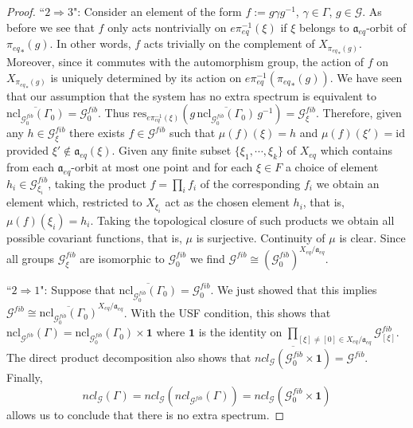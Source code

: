 \documentclass[12pt]{amsart}
\theoremstyle{definition}
\numberwithin{equation}{section}
\newcommand{\tcr}{\textcolor{red}}
\newcommand{\Gg}{{\mathcal G}}
\newcommand{\id}{{\mathbf 1}}
\newcommand{\Xe}{X_{eq}}
\newcommand{\aut}{{\mathfrak a}}
\newcommand{\aute}{\aut_{eq}}
\newcommand{\Xmax}{\Xe}
\newcommand{\pe}{\pi_{eq}}
\newcommand{\res}{\mathrm{res}}
\begin{document}
\begin{proof}
``$2 \Rightarrow 3$":      
Consider an element  of the form $f:=g\gamma g^{-1}$, $\gamma\in\Gamma$, $g\in \Gg$. As before we see that $f$ only acts nontrivially on $e\pe^{-1}(\xi)$ if $\xi$ belongs to  $\aute$-orbit of ${\pe}_*(g)$. In other words, $f$ acts trivially on the complement of $X_{{\pe}_*(g)}$. Moreover, since it commutes with the automorphism group, the action of $f$ on $X_{{\pe}_*(g)}$ is uniquely determined by its action on $e\pe^{-1}({\pe}_*(g))$. We have seen that our assumption that the system has no extra spectrum is equivalent to  
$   \overline{   \text{ncl}_{ \Gg_0^{fib} }(\Gamma_0) }    = \Gg^{fib}_0$. 
Thus
$\res_{e\pe^{-1}(\xi) }(g   \,   \overline{\text{ncl}_{\Gg^{fib}_0}(\Gamma_0)}  \, g^{-1}) = \Gg^{fib}_\xi$. Therefore, given any $h\in \Gg^{fib}_\xi$ there exists $f\in\Gg^{fib}$ such that $\mu(f)(\xi) = h$ and   $\mu(f)(\xi') = \mathrm{id}$
provided $\xi'\notin\aute(\xi)$. Given any finite subset $\{\xi_1,\cdots,\xi_k\}$ of $\Xe$ which contains from each $\aute$-orbit at most one point and for each $\xi\in F$ a choice of element $h_i\in \Gg^{fib}_{\xi_i}$, taking the product $f=\prod_i f_i$ of the corresponding $f_i$ we obtain an element which, restricted to $X_{\xi_i}$ act as the chosen element $h_i$, that is, $\mu(f)(\xi_i) = h_i$. Taking the topological closure of such products we obtain all possible covariant functions, that is, $\mu$ is surjective. Continuity of $\mu$ is clear.
Since all groups $\Gg^{fib}_\xi$ are isomorphic to  $\Gg^{fib}_0$
we find  $\Gg^{fib} \cong  (\Gg^{fib}_0)^{\Xe/\aute}$.

``$2  \Rightarrow 1$":
Suppose that %
$  \overline{\text{ncl}_{\Gg^{fib}_0}(\Gamma_0)} =\Gg^{fib}_0$.
   We just showed that this implies $\Gg^{fib} \cong     \overline{   \text{ncl}_{ \Gg_0^{fib} }(\Gamma_0) }       ^{\Xe/\aute}$. With the USF condition, this shows that 
 $         \text{ncl}_{ \Gg^{fib} }(\Gamma) =  \text{ncl}_{ \Gg_0^{fib} }(\Gamma_0)        \times \id $                 where $\id$ is the identity on $\prod_{[\xi]\neq [0]\in \Xmax/\aute} \Gg^{fib}_{[\xi]}$. The direct product decomposition also shows that 
$\overline{ncl_\Gg(\Gg^{fib}_0\times\id)}=\Gg^{fib}$. Finally, 
      $$ncl_\Gg  (\Gamma)=ncl_\Gg (ncl_{   \Gg^{fib}  }(\Gamma)) = ncl_{\Gg } (\Gg^{fib}_0\times\id)$$
allows us to conclude that there is no extra spectrum.
\end{proof}
\end{document}
